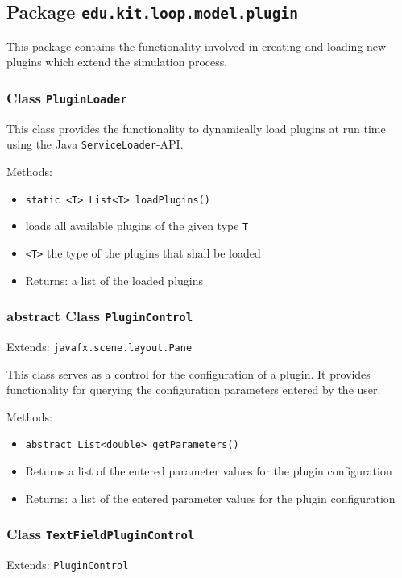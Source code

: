 \documentclass[parskip=full,11pt]{scrartcl}
\begin{document}
\subsection{Package \texttt{edu.kit.loop.model.plugin}}

This package contains the functionality involved in creating and loading new plugins which extend the simulation process.

\subsubsection{Class \texttt{PluginLoader}}

This class provides the functionality to dynamically load plugins at run time using the Java \texttt{ServiceLoader}-API.

Methods:

\begin{itemize}\itemsep -10pt
	\item \texttt{static <T> List<T> loadPlugins()}
	\item[] loads all available plugins of the given type \texttt{T}
	\item[] \texttt{<T>} the type of the plugins that shall be loaded
	\item[]Returns: a list of the loaded plugins
\end{itemize}

\subsubsection{abstract Class \texttt{PluginControl}}
Extends: \texttt{javafx.scene.layout.Pane}

This class serves as a control for the configuration of a plugin. It provides functionality for querying the configuration parameters entered by the user.

Methods:

\begin{itemize}\itemsep -10pt
	\item \texttt{abstract List<double> getParameters()}
	\item[] Returns a list of the entered parameter values for the plugin configuration
	\item[] Returns: a list of the entered parameter values for the plugin configuration
\end{itemize}

\subsubsection{Class \texttt{TextFieldPluginControl}}
Extends: \texttt{PluginControl}
\end{document}
